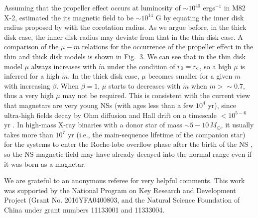 \documentclass[12pt,preprint]{aastex}
\begin{document}
Assuming that the propeller effect occurs at luminosity of $\sim 10^{40}$ ergs$^{-1}$ in M82 X-2, \cite{tmsp2016} estimated the its magnetic field to be $\sim 10^{14}$ G  by equating the inner disk radius proposed by \citet{gl1979} with the corotation radius.
As we argue before, in the thick disk case, the inner disk radius may deviate from that in the thin disk case.
A comparison of the $\mu-\dot{m}$ relations for the occurrence of the propeller effect in the thin and thick disk models is shown in Fig.~3.
We can see that in the thin disk model $\mu$ always increases with $\dot{m}$ under the condition of $r_0=r_{\rm c}$, so a high $\mu$ is inferred for a high $\dot{m}$. In the thick disk case, $\mu$ becomes smaller for a given $\dot{m}$ with increasing $\beta$. When $\beta=1$, $\mu$ starts to decreases with $\dot{m}$ when $\dot{m}>\sim 0.7$,
thus a very high $\mu$ may not be required. This is consistent with the current view that magnetars are very young NSs (with ages less than a few $10^4$ yr), since ultra-high fields decay by Ohm diffusion and Hall drift on a timescale $<10^{5-6}$ yr \citep[][for a review]{tzw2015}. In high-mass X-ray binaries with a donor star of mass $\sim 5-10\,M_{\odot}$, it usually takes more than $10^7$ yr (i.e., the main-sequence lifetime of the companion star) for the systems to enter the Roche-lobe overflow phase after the birth of the NS \citep{bh1991,sl2015}, so the NS magnetic field may have already decayed into the normal range even if it was born as a magnetar.

\acknowledgements We are grateful to an anonymous referee for very helpful comments. This work was supported by the National Program on Key Research and Development Project (Grant No. 2016YFA0400803, and the Natural Science Foundation of China under grant numbers 11133001 and 11333004.
\end{document}
